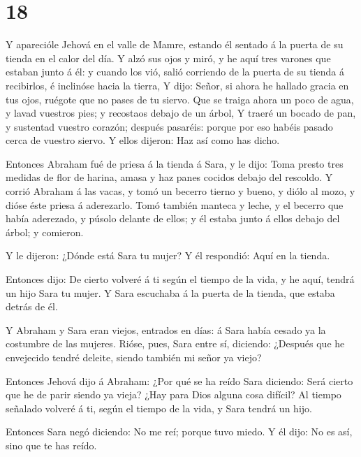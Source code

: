 \hypertarget{section-17}{%
\section{18}\label{section-17}}

 Y aparecióle Jehová en el valle de Mamre, estando él
sentado á la puerta de su tienda en el calor del día.  Y
alzó sus ojos y miró, y he aquí tres varones que estaban junto á él: y
cuando los vió, salió corriendo de la puerta de su tienda á recibirlos,
é inclinóse hacia la tierra,  Y dijo: Señor, si ahora he
hallado gracia en tus ojos, ruégote que no pases de tu siervo.
 Que se traiga ahora un poco de agua, y lavad vuestros pies;
y recostaos debajo de un árbol,  Y traeré un bocado de pan,
y sustentad vuestro corazón; después pasaréis: porque por eso habéis
pasado cerca de vuestro siervo. Y ellos dijeron: Haz así como has dicho.

 Entonces Abraham fué de priesa á la tienda á Sara, y le
dijo: Toma presto tres medidas de flor de harina, amasa y haz panes
cocidos debajo del rescoldo.  Y corrió Abraham á las vacas,
y tomó un becerro tierno y bueno, y diólo al mozo, y dióse éste priesa á
aderezarlo.  Tomó también manteca y leche, y el becerro que
había aderezado, y púsolo delante de ellos; y él estaba junto á ellos
debajo del árbol; y comieron.

 Y le dijeron: ¿Dónde está Sara tu mujer? Y él respondió:
Aquí en la tienda.

 Entonces dijo: De cierto volveré á ti según el tiempo de
la vida, y he aquí, tendrá un hijo Sara tu mujer. Y Sara escuchaba á la
puerta de la tienda, que estaba detrás de él.

 Y Abraham y Sara eran viejos, entrados en días: á Sara
había cesado ya la costumbre de las mujeres.  Rióse, pues,
Sara entre sí, diciendo: ¿Después que he envejecido tendré deleite,
siendo también mi señor ya viejo?

 Entonces Jehová dijo á Abraham: ¿Por qué se ha reído Sara
diciendo: Será cierto que he de parir siendo ya vieja? 
¿Hay para Dios alguna cosa difícil? Al tiempo señalado volveré á ti,
según el tiempo de la vida, y Sara tendrá un hijo.

 Entonces Sara negó diciendo: No me reí; porque tuvo miedo.
Y él dijo: No es así, sino que te has reído.

